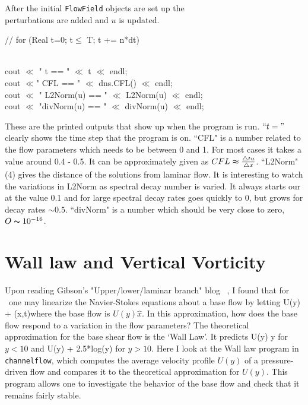 \documentclass[pre,twocolumn,groupedaddress]{revtex4}
\begin{document}
After the initial {\verb"FlowField"} objects are set up the \\
perturbations are added and $u$ is updated.

    \noindent // for (Real t=0; t$\leq$ T; t += n*dt) { \\
    cout $\ll$ "         t == " $\ll$ t $\ll$ endl; \\
    cout $\ll$"       CFL == " $\ll$ dns.CFL() $\ll$ endl; \\
    cout $\ll$ " L2Norm(u) == " $\ll$ L2Norm(u) $\ll$ endl; \\
    cout $\ll$ "divNorm(u) == " $\ll$ divNorm(u) $\ll$ endl;

 These are the printed outputs that show up when the program is run.
$``t ="$
clearly shows the time step that the program is on.
 ``CFL" is a number related to the flow parameters which needs to be
 between 0 and 1. For most cases it takes a value around
 0.4 - 0.5.  It can be approximately given as $CFL \thickapprox \frac{\triangle t u}{\triangle
 x}$. ``L2Norm" (4) gives the distance of the solutions from laminar
 flow.  It is interesting to watch the variations in L2Norm as spectral decay number is varied.
  It always starts our at the value 0.1 and for large spectral decay rates goes quickly to
 0, but grows for decay rates $\sim 0.5$.
``divNorm" is a number which should be very close to
 zero, $O\thicksim 10^{-16}$.


\section{Wall law and Vertical Vorticity}
\label{sec:WallLaw}

 Upon reading Gibson's "Upper/lower/laminar branch" blog ~\cite{stability-spring}, I
found that for \pCf\ one may linearize the Navier-Stokes equations
about a base flow by letting \beq {} \rightarrow U(y)  +
(x,t)\eeq where the base flow is $U(y) \hat{x}$. In this
approximation, how does the base flow respond to a variation in the
flow parameters? The theoretical approximation for the base shear
flow is the `Wall Law'. It predicts \beq U(y) \thicksim y \eeq
 for $y <10$ and
       \beq U(y)  + 2.5*log(y) \eeq for  $y > 10$.
 Here I look at the Wall law program in {\tt channelflow}, which
computes the average velocity profile $U(y)$ of a pressure-driven
flow and compares it to the theoretical approximation for $U(y)$.
This program allows one to investigate the behavior of the base flow
and check that it remains fairly stable.

}
\end{document}

